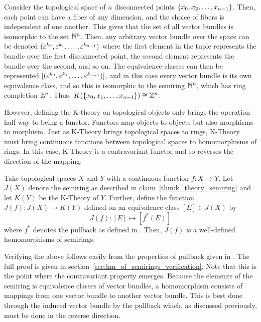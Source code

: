 \documentclass[../sean_thesis.tex]{subfiles}
\begin{document}
\begin{example}
	Consider the topological space of $n$ disconnected points $\left\{x_0, x_2, \dots, x_{n-1}\right\}$. Then, each point can have a fiber of any dimension, and the choice of fibers is independent of one another. This gives that the set of all vector bundles is isomorphic to the set $\mathbb{N}^n$. Then, any arbitrary vector bundle over the space can be denoted $(\varepsilon^{k_0}, \varepsilon^{k_1}, \dots, \varepsilon^{k_{n-1}})$ where the first element in the tuple represents the bundle over the first disconnected point, the second element represents the bundle over the second, and so on. The equivalence classes can then be represented $[(\varepsilon^{k_0}, \varepsilon^{k_1}, \dots, \varepsilon^{k_{n-1}})]$, and in this case every vector bundle is its own equivalence class, and so this is isomorphic to the semiring $\mathbb{N}^n$, which has ring completion $\mathbb{Z}^n$. Thus, $K(\left\{x_0, x_1, \dots, x_{n-1}\right\}) \cong \mathbb{Z}^n$.
\end{example}

However, defining the K-theory on topological objects only brings the operation half way to being a functor. Functors map objects to objects but also morphisms to morphism. Just as K-Theory brings topological spaces to rings, K-Theory must bring continuous functions between topological spaces to homomorphisms of rings. In this case, K-Theory is a contravariant functor and so reverses the direction of the mapping.

\begin{claim}
\label{thm:hm_of_semirings}
	Take topological spaces $X$ and $Y$ with a continuous function $f: X \to Y$. Let $J(X)$ denote the semiring as described in claim~\ref{thm:k_theory_semiring} and let $K(Y)$ be the K-Theory of $Y$. Further, define the function $J(f): J(X) \to K(Y)$ defined on an equivalence class $[E] \in J(X)$ by
	\begin{equation*}
		J(f): [E] \mapsto [f^{*}(E)]
	\end{equation*}
where $f^{*}$ denotes the pullback as defined in . Then, $J(f)$ is a well-defined homomorphisms of semirings.
\end{claim}

Verifying the above follows easily from the properties of pullback given in . The full proof is given in section~\ref{sec:hm_of_semirings_verification}. Note that this is the point where the contravariant property emerges. Because the elements of the semiring is equivalence classes of vector bundles, a homomorphism consists of mappings from one vector bundle to another vector bundle. This is best done through the induced vector bundle by the pullback which, as discussed previously, must be done in the reverse direction.
\end{document}
